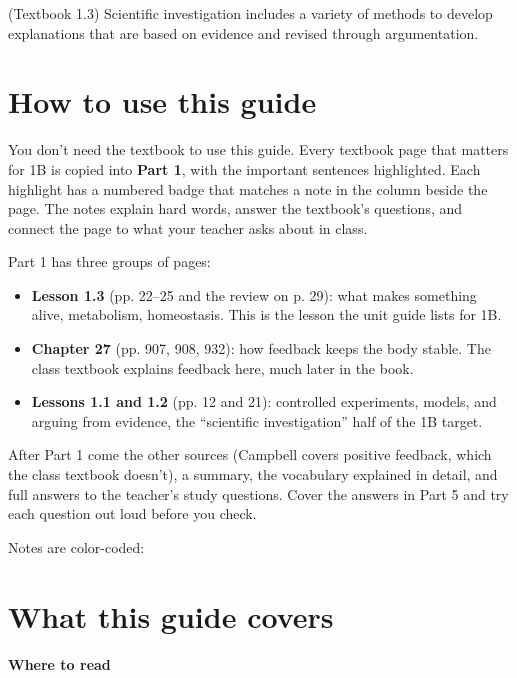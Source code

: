 \documentclass[11pt,letterpaper]{article}
\begin{document}
  {(Textbook 1.3) Scientific investigation includes a variety of methods to develop explanations that are based on evidence and revised through argumentation.}

\section{How to use this guide}

You don't need the textbook to use this guide. Every textbook page that matters for 1B is copied into \textbf{Part 1}, with the important sentences highlighted. Each highlight has a numbered badge that matches a note in the column beside the page. The notes explain hard words, answer the textbook's questions, and connect the page to what your teacher asks about in class.

Part 1 has three groups of pages:

\begin{itemize}
  \item \textbf{Lesson 1.3} (pp. 22–25 and the review on p. 29): what makes something alive, metabolism, homeostasis. This is the lesson the unit guide lists for 1B.
  \item \textbf{Chapter 27} (pp. 907, 908, 932): how feedback keeps the body stable. The class textbook explains feedback here, much later in the book.
  \item \textbf{Lessons 1.1 and 1.2} (pp. 12 and 21): controlled experiments, models, and arguing from evidence, the ``scientific investigation'' half of the 1B target.
\end{itemize}

After Part 1 come the other sources (Campbell covers positive feedback, which the class textbook doesn't), a summary, the vocabulary explained in detail, and full answers to the teacher's study questions. Cover the answers in Part 5 and try each question out loud before you check.

Notes are color-coded:
\notelegend

\section{What this guide covers}

\textbf{Where to read}
\end{document}
